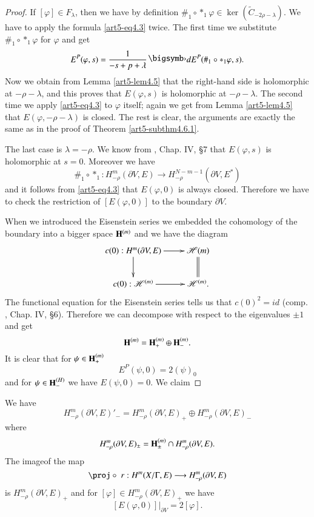 \begin{proof}
If $[\varphi] \in F_\lambda$, then we have by definition $\#_1 \circ \ast_1 \varphi \in \ker (\tilde{C}_{-2\rho -\lambda})$. We have to apply the formula \eqref{art5-eq4.3} twice. The first time we substitute $\#_1 \circ \ast_1 \varphi$ for $\varphi$ and get
$$ 
E^P(\varphi, s) =\frac{1}{-s + p +\lambda} \bigdot dE^P  (\#_1 \circ \ast_1 \varphi, s).
$$
Now we obtain from Lemma \eqref{art5-lem4.5} that the right-hand side is holomorphic at $-\rho -\lambda$, and this proves that $E(\varphi, s)$ is holomorphic at $-\rho-\lambda$. The second time we apply \eqref{art5-eq4.3} to $\varphi$ itself; again we get from Lemma \eqref{art5-lem4.5} that $E(\varphi, - \rho -\lambda)$ is closed. The rest is clear, the arguments are exactly the same as in the proof of Theorem \eqref{art5-subthm4.6.1}.

The last case is $\lambda = - \rho$. We know from \cite{art5-key8}, Chap. IV, \S 7 that $E(\varphi, s)$ is holomorphic at $s =0$. Moreover we have
$$
\#_1 \circ \ast_1: H^m_{-\rho} (\partial V,E) \longrightarrow H^{N-m-1}_{-\rho} (\partial V, E^\ast)
$$
and it follows from \eqref{art5-eq4.3} that $E (\varphi, 0)$ is always closed. Therefore we have to check the restriction of $[E(\varphi, 0)]$ to the boundary $\partial V$.

When we introduced the Eisenstein series we embedded the cohomology of the boundary into a bigger space $\mathbf{H}^{(m)}$ and we have the diagram
$$ 
\xymatrix{
c(0) : H^m (\partial V, E) \ar[r] \ar[d] & \sH{(m)} \ar@{=}[d]\\
c(0) : \sH^{(m)} \ar[r] & \sH^{(m)}  .
}
$$
The functional equation for the Eisenstein series tells us that $c(0)^2 = id$ (comp. \cite{art5-key8}, Chap. IV, \S 6). Therefore we can decompose with respect to the eigenvalues $\pm 1$  and get
$$
\mathbf{H}^{(m)} = \mathbf{H}^{(m)}_+ \oplus \mathbf{H}^{(m)}_-.
$$
It is clear that for $\psi\in\mathbf{H}^{(m)}_+$
$$
E^P (\psi, 0) = 2 (\psi)_0
$$
and for $\psi \in \mathbf{H}^{(H)}_-$ we have $E (\psi, 0) =0$. We claim
\end{proof}

\begin{subtheorem}\label{art5-sublem4.6.3}
We have
$$
H^m_{-\rho} (\partial V, E)'_-= H^m_{-\rho} (\partial V, E)_+ \oplus H^m_{-\rho} (\partial V, E)_-
$$
where 
$$
H^m_{-\rho} (\partial V, E)_{\pm} =\mathbf{H}^{(m)}_{\pm} \cap H^m_{-\rho} (\partial V, E).
$$
The image\pageoriginale of the map
$$
\proj \circ \; r :H^m (X/ \Gamma, E) \longrightarrow H^m_{-\rho} (\partial V,E)
$$
is $H^m_{-\rho} (\partial V, E)_+$ and for $[\varphi] \in H^m_{-\rho} (\partial V, E)_+$ we have
$$
[E(\varphi, 0)] |_{\partial V} =  2 [\varphi].
$$
\end{subtheorem}

